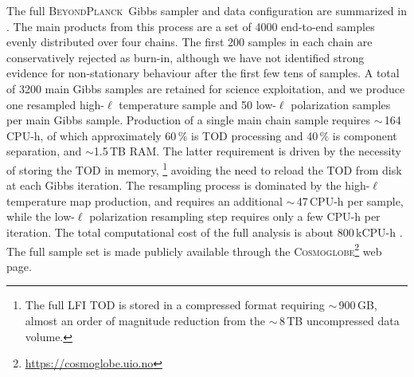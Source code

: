 \documentclass[twocolumn]{aa}
\def\cosmoglobe{\textsc{Cosmoglobe}}
\newcommand{\red}[0]{\color{red}}
\newcommand{\BP}{\textsc{BeyondPlanck}}
\begin{document}
The full \BP\ Gibbs sampler and data configuration are summarized in
\citet{bp01}. The main products from this process are a set of 4000
end-to-end samples evenly distributed over four chains. The first 200 samples
in each chain are conservatively rejected as burn-in, although we have
not identified strong evidence for non-stationary behaviour after the
first few tens of samples. A total of 3200 main Gibbs samples are
retained for science exploitation, and we produce one resampled
high-$\ell$ temperature sample and 50 low-$\ell$ polarization samples
per main Gibbs sample. {\red Production of a single main chain sample requires $\sim$\,164\,CPU-h, of which approximately 60\,\% is TOD processing and 40\,\% is component separation, and $\sim$1.5\,TB RAM. The latter requirement is driven by the necessity of storing the TOD in memory, \footnote{The full LFI TOD is stored in a compressed format requiring $\sim$\,900\,GB, almost an order of magnitude reduction from the $\sim$\,8\,TB uncompressed data volume.} avoiding the need to reload the TOD from disk at each Gibbs iteration. The resampling process is dominated by the high-$\ell$ temperature map production, and requires an additional $\sim$\,47\,CPU-h per sample, while the low-$\ell$ polarization resampling step requires only a few CPU-h per iteration.} The total computational cost of the full
analysis is about 800\,kCPU-h \citep{bp03}. The full sample set is
made publicly available through the
\cosmoglobe\footnote{\url{https://cosmoglobe.uio.no}} web page.
\end{document}

